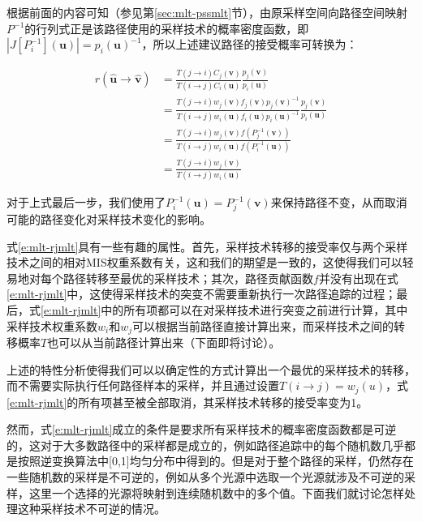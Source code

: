 根据前面的内容可知（参见第\ref{sec:mlt-pssmlt}节），由原采样空间向路径空间映射$P^{-1}$的行列式正是该路径使用的采样技术的概率密度函数，即$|J[P^{-1}_i](\mathbf{u})|=p_i(\mathbf{u})^{-1}$，所以上述建议路径的接受概率可转换为：

\begin{equation}\label{e:mlt-rjmlt}
\begin{aligned}
	r(\hat{\mathbf{u}}\to\hat{\mathbf{v}})&=\frac{T(j\to i)C_j({\mathbf{v}})}{T(i\to j)C_i({\mathbf{u}})}\frac{p_j({\mathbf{v}})}{p_i({\mathbf{u}})}\\
	&=\frac{T(j\to i)w_j({\mathbf{v}})f_j({\mathbf{v}})p_j({\mathbf{v}})^{-1}}{T(i\to j)w_i({\mathbf{u}})f_i({\mathbf{u}})p_i({\mathbf{u}})^{-1}}\frac{p_j({\mathbf{v}})}{p_i({\mathbf{u}})}\\
	&=\frac{T(j\to i)w_j({\mathbf{v}})f(P^{-1}_j({\mathbf{v}}))}{T(i\to j)w_i({\mathbf{u}})f(P^{-1}_i({\mathbf{u}}))}\\
	&=\frac{T(j\to i)w_j({\mathbf{v}})}{T(i\to j)w_i({\mathbf{u}})}
\end{aligned}
\end{equation}

\noindent 对于上式最后一步，我们使用了$P^{-1}_i({\mathbf{u}})=P^{-1}_j({\mathbf{v}})$来保持路径不变，从而取消可能的路径变化对采样技术变化的影响。

式\ref{e:mlt-rjmlt}具有一些有趣的属性。首先，采样技术转移的接受率仅与两个采样技术之间的相对MIS权重系数有关，这和我们的期望是一致的，这使得我们可以轻易地对每个路径转移至最优的采样技术；其次，路径贡献函数$f$并没有出现在式\ref{e:mlt-rjmlt}中，这使得采样技术的突变不需要重新执行一次路径追踪的过程；最后，式\ref{e:mlt-rjmlt}中的所有项都可以在对采样技术进行突变之前进行计算，其中采样技术权重系数$w_i$和$w_j$可以根据当前路径直接计算出来，而采样技术之间的转移概率$T$也可以从当前路径计算出来（下面即将讨论）。

上述的特性分析使得我们可以以确定性的方式计算出一个最优的采样技术的转移，而不需要实际执行任何路径样本的采样，并且通过设置$T(i\to j)=w_j({u})$，式\ref{e:mlt-rjmlt}的所有项甚至被全部取消，其采样技术转移的接受率变为1。

然而，式\ref{e:mlt-rjmlt}成立的条件是要求所有采样技术的概率密度函数都是可逆的，这对于大多数路径中的采样都是成立的，例如路径追踪中的每个随机数几乎都是按照逆变换算法中[0,1]均匀分布中得到的。但是对于整个路径的采样，仍然存在一些随机数的采样是不可逆的，例如从多个光源中选取一个光源就涉及不可逆的采样，这里一个选择的光源将映射到连续随机数中的多个值。下面我们就讨论怎样处理这种采样技术不可逆的情况。





